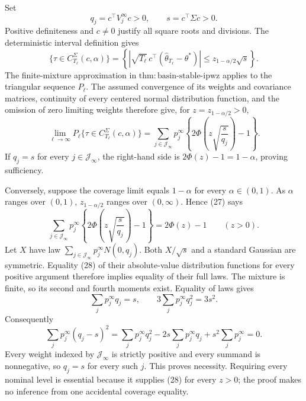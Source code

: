 Set
\[
 q_j=c^\top V_j^\infty c>0,
 \qquad s=c^\top\Sigma c>0.
\]
Positive definiteness and \(c\ne0\) justify all square roots and divisions. The deterministic interval definition gives
\[
 \{\tau\in C_{T_\ell}^{\Sigma}(c,\alpha)\}
 =\left\{\left|\sqrt{T_\ell}\,c^\top(\widehat\theta_{T_\ell}-\theta^*)\right|
 \le z_{1-\alpha/2}\sqrt s\right\}.
\tag{26}
\]
The finite-mixture approximation in \(\mathrm{thm:basin\text{-}stable\text{-}ipwz}\) applies to the triangular sequence \(P_\ell\). The assumed convergence of its weights and covariance matrices, continuity of every centered normal distribution function, and the omission of zero limiting weights therefore give, for \(z=z_{1-\alpha/2}>0\),
\[
 \lim_{\ell\to\infty}P_\ell\{\tau\in C_{T_\ell}^{\Sigma}(c,\alpha)\}
 =\sum_{j\in\mathcal J_\infty}p_j^\infty
 \left\{2\Phi\left(z\sqrt{\frac{s}{q_j}}\right)-1\right\}.
\tag{27}
\]
If \(q_j=s\) for every \(j\in\mathcal J_\infty\), the right-hand side is \(2\Phi(z)-1=1-\alpha\), proving sufficiency.

Conversely, suppose the coverage limit equals \(1-\alpha\) for every \(\alpha\in(0,1)\). As \(\alpha\) ranges over \((0,1)\), \(z_{1-\alpha/2}\) ranges over \((0,\infty)\). Hence (27) says
\[
 \sum_{j\in\mathcal J_\infty}p_j^\infty
 \left\{2\Phi\left(z\sqrt{\frac{s}{q_j}}\right)-1\right\}
 =2\Phi(z)-1
 \qquad(z>0).
\tag{28}
\]
Let \(X\) have law \(\sum_{j\in\mathcal J_\infty}p_j^\infty N(0,q_j)\). Both \(X/\sqrt s\) and a standard Gaussian are symmetric. Equality (28) of their absolute-value distribution functions for every positive argument therefore implies equality of their full laws. The mixture is finite, so its second and fourth moments exist. Equality of laws gives
\[
 \sum_jp_j^\infty q_j=s,
 \qquad 3\sum_jp_j^\infty q_j^2=3s^2.
\]
Consequently
\[
 \sum_jp_j^\infty(q_j-s)^2
 =\sum_jp_j^\infty q_j^2-2s\sum_jp_j^\infty q_j+s^2\sum_jp_j^\infty=0.
\]
Every weight indexed by \(\mathcal J_\infty\) is strictly positive and every summand is nonnegative, so \(q_j=s\) for every such \(j\). This proves necessity. Requiring every nominal level is essential because it supplies (28) for every \(z>0\); the proof makes no inference from one accidental coverage equality.